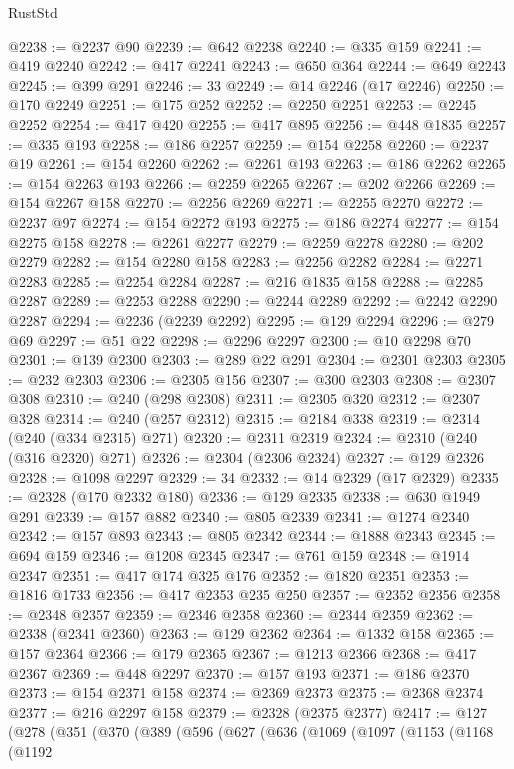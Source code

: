 \begin{lexlean}{RustStd}
\begin{coremodule}
@2238 := @2237 @90
@2239 := @642 @2238
@2240 := @335 @159
@2241 := @419 @2240
@2242 := @417 @2241
@2243 := @650 @364
@2244 := @649 @2243
@2245 := @399 @291
@2246 := 33
@2249 := @14 @2246 (@17 @2246)
@2250 := @170 @2249
@2251 := @175 @252
@2252 := @2250 @2251
@2253 := @2245 @2252
@2254 := @417 @420
@2255 := @417 @895
@2256 := @448 @1835
@2257 := @335 @193
@2258 := @186 @2257
@2259 := @154 @2258
@2260 := @2237 @19
@2261 := @154 @2260
@2262 := @2261 @193
@2263 := @186 @2262
@2265 := @154 @2263 @193
@2266 := @2259 @2265
@2267 := @202 @2266
@2269 := @154 @2267 @158
@2270 := @2256 @2269
@2271 := @2255 @2270
@2272 := @2237 @97
@2274 := @154 @2272 @193
@2275 := @186 @2274
@2277 := @154 @2275 @158
@2278 := @2261 @2277
@2279 := @2259 @2278
@2280 := @202 @2279
@2282 := @154 @2280 @158
@2283 := @2256 @2282
@2284 := @2271 @2283
@2285 := @2254 @2284
@2287 := @216 @1835 @158
@2288 := @2285 @2287
@2289 := @2253 @2288
@2290 := @2244 @2289
@2292 := @2242 @2290 @2287
@2294 := @2236 (@2239 @2292)
@2295 := @129 @2294
@2296 := @279 @69
@2297 := @51 @22
@2298 := @2296 @2297
@2300 := @10 @2298 @70
@2301 := @139 @2300
@2303 := @289 @22 @291
@2304 := @2301 @2303
@2305 := @232 @2303
@2306 := @2305 @156
@2307 := @300 @2303
@2308 := @2307 @308
@2310 := @240 (@298 @2308)
@2311 := @2305 @320
@2312 := @2307 @328
@2314 := @240 (@257 @2312)
@2315 := @2184 @338
@2319 := @2314 (@240 (@334 @2315) @271)
@2320 := @2311 @2319
@2324 := @2310 (@240 (@316 @2320) @271)
@2326 := @2304 (@2306 @2324)
@2327 := @129 @2326
@2328 := @1098 @2297
@2329 := 34
@2332 := @14 @2329 (@17 @2329)
@2335 := @2328 (@170 @2332 @180)
@2336 := @129 @2335
@2338 := @630 @1949 @291
@2339 := @157 @882
@2340 := @805 @2339
@2341 := @1274 @2340
@2342 := @157 @893
@2343 := @805 @2342
@2344 := @1888 @2343
@2345 := @694 @159
@2346 := @1208 @2345
@2347 := @761 @159
@2348 := @1914 @2347
@2351 := @417 @174 @325 @176
@2352 := @1820 @2351
@2353 := @1816 @1733
@2356 := @417 @2353 @235 @250
@2357 := @2352 @2356
@2358 := @2348 @2357
@2359 := @2346 @2358
@2360 := @2344 @2359
@2362 := @2338 (@2341 @2360)
@2363 := @129 @2362
@2364 := @1332 @158
@2365 := @157 @2364
@2366 := @179 @2365
@2367 := @1213 @2366
@2368 := @417 @2367
@2369 := @448 @2297
@2370 := @157 @193
@2371 := @186 @2370
@2373 := @154 @2371 @158
@2374 := @2369 @2373
@2375 := @2368 @2374
@2377 := @216 @2297 @158
@2379 := @2328 (@2375 @2377)
@2417 := @127
    (@278
      (@351
        (@370
          (@389
            (@596
              (@627
                (@636
                  (@1069
                    (@1097
                      (@1153
                        (@1168
                          (@1192

\end{coremodule}
\end{lexlean}
